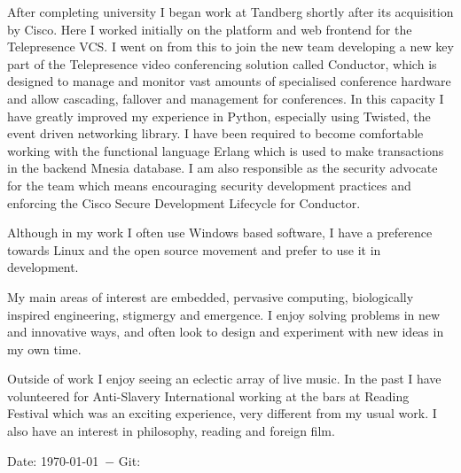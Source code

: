 \documentclass[overlapped,line,letterpaper]{res}
\begin{document}
\begin{resume}
After completing university I began work at Tandberg shortly after its acquisition
by Cisco.
Here I worked initially on the platform and web frontend for the
Telepresence VCS.
I went on from this to join the new team developing a new key part of the
Telepresence video conferencing solution called Conductor, which is designed
to manage and monitor vast amounts of specialised conference hardware and
allow cascading, fallover and management for conferences.
In this capacity I have greatly improved my experience in Python, especially
using Twisted, the event driven networking library.
I have been required to become comfortable working with the functional
language Erlang which is used to make transactions in the backend Mnesia database.
I am also responsible as the security advocate for the team which means encouraging
security development practices and enforcing the Cisco Secure Development Lifecycle
for Conductor.

Although in my work I often use Windows based software, I have a preference towards
Linux and the open source movement and prefer to use it in development.

My main areas of interest are embedded, pervasive computing, biologically
inspired engineering, stigmergy and emergence.
I enjoy solving problems in new and innovative ways, and often look to design and
experiment with new ideas in my own time.

Outside of work I enjoy seeing an eclectic array of live music. In the past I
have volunteered for Anti-Slavery International working at the bars at Reading
Festival which was an exciting experience, very different from my usual work.
I also have an interest in philosophy, reading and foreign film.


\begin{center}
    {\tiny \rm $ $Date: \today \ $-$ Git:  $ $ }
\end{center}

\end{resume}
\end{document}
